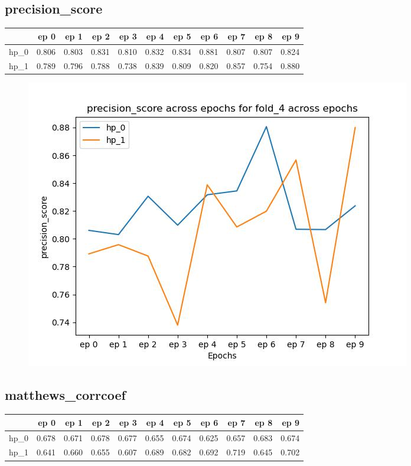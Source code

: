 \documentclass{article}
\begin{document}
\subsection{precision\_score}
\begin{tabular}{lrrrrrrrrrr}
\toprule
{} &   ep 0 &   ep 1 &   ep 2 &   ep 3 &   ep 4 &   ep 5 &   ep 6 &   ep 7 &   ep 8 &   ep 9 \\
\midrule
hp\_0 &  0.806 &  0.803 &  0.831 &  0.810 &  0.832 &  0.834 &  0.881 &  0.807 &  0.807 &  0.824 \\
hp\_1 &  0.789 &  0.796 &  0.788 &  0.738 &  0.839 &  0.809 &  0.820 &  0.857 &  0.754 &  0.880 \\
\bottomrule
\end{tabular}

\begin{figure}[H]
\includegraphics[scale = 0.75]{fold_4/precision_score}
\end{figure}
\subsection{matthews\_corrcoef}
\begin{tabular}{lrrrrrrrrrr}
\toprule
{} &   ep 0 &   ep 1 &   ep 2 &   ep 3 &   ep 4 &   ep 5 &   ep 6 &   ep 7 &   ep 8 &   ep 9 \\
\midrule
hp\_0 &  0.678 &  0.671 &  0.678 &  0.677 &  0.655 &  0.674 &  0.625 &  0.657 &  0.683 &  0.674 \\
hp\_1 &  0.641 &  0.660 &  0.655 &  0.607 &  0.689 &  0.682 &  0.692 &  0.719 &  0.645 &  0.702 \\
\bottomrule
\end{tabular}
\end{document}

